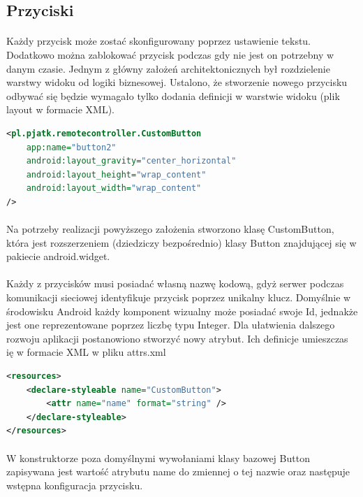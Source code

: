 \subsection{Przyciski}
\paragraph{}
Każdy przycisk może zostać skonfigurowany poprzez ustawienie tekstu. Dodatkowo można zablokować przycisk podczas gdy nie jest on potrzebny w danym czasie. 
Jednym z główny założeń architektonicznych był rozdzielenie warstwy widoku od logiki biznesowej. Ustalono, że stworzenie nowego przycisku odbywać się będzie wymagało tylko dodania definicji w warstwie widoku (plik layout w formacie XML).

\begin{lstlisting}[language=XML]
<pl.pjatk.remotecontroller.CustomButton
    app:name="button2"
    android:layout_gravity="center_horizontal"
    android:layout_height="wrap_content"
    android:layout_width="wrap_content"
/>
\end{lstlisting}
\paragraph{}
Na potrzeby realizacji powyższego założenia stworzono klasę CustomButton, która jest rozszerzeniem (dziedziczy bezpośrednio) klasy Button znajdującej się w pakiecie  android.widget.
\paragraph{}
Każdy z przycisków musi posiadać własną nazwę kodową, gdyż serwer podczas komunikacji sieciowej identyfikuje przycisk poprzez unikalny klucz. Domyślnie w środowisku Android każdy komponent wizualny może posiadać swoje Id, jednakże jest one reprezentowane poprzez liczbę typu Integer.
Dla ułatwienia dalszego rozwoju aplikacji postanowiono stworzyć nowy atrybut. Ich definicje umieszczas ię w formacie XML w pliku attrs.xml

\begin{lstlisting}[language=XML]
<resources>
    <declare-styleable name="CustomButton">
        <attr name="name" format="string" />
    </declare-styleable>
</resources>
\end{lstlisting}

\paragraph{}
W konstruktorze poza domyślnymi wywołaniami klasy bazowej Button zapisywana jest wartość atrybutu name do zmiennej o tej nazwie oraz następuje wstępna konfiguracja przycisku.


